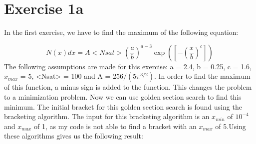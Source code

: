 \section{Exercise 1a}



In the first exercise, we have to find the maximum of the following equation: 

\begin{equation}
    N(x)dx = A <Nsat> \left( \frac{a}{b} \right)^{a-3} \exp(\left[ - \left( \frac{x}{b} \right)^c \right])
\end{equation}
The following  assumptions are made for this exercise: a = 2.4, b = 0.25, c = 1.6, $x_{max}$ = 5, <Nsat> = 100 and A = $256/(5\pi^{3/2})$. In order to find the maximum of this function, a minus sign is added to the function. This changes the problem to a minimization problem. Now we can use golden section search to find this minimum. The initial bracket for this golden section search is found using the bracketing algorithm. The input for this bracketing algorithm is an $x_{min}$ of $10^{-4}$ and $x_{max}$ of 1, as my code is not able to find a bracket with an $x_{max}$ of 5.Using these algorithms gives us the following result: 
\\
\\



